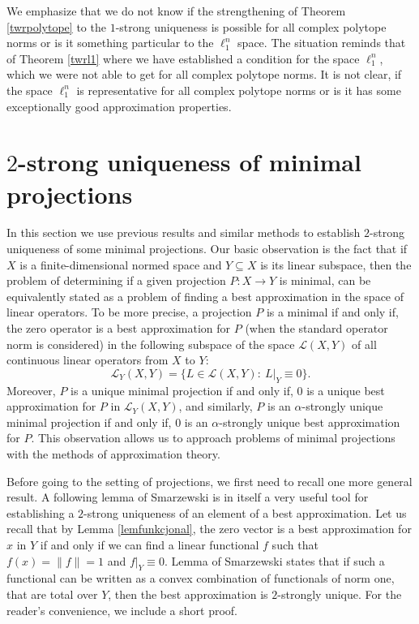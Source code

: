 \documentclass[12pt, reqno]{amsart}
\theoremstyle{definition}
\theoremstyle{remark}
\numberwithin{equation}{section}
\begin{document}
We emphasize that we do not know if the strengthening of Theorem \ref{twrpolytope} to the $1$-strong uniqueness is possible for all complex polytope norms or is it something particular to the $\ell_1^n$ space. The situation reminds that of Theorem \ref{twrl1} where we have established a condition for the space $\ell_1^n$, which we were not able to get for all complex polytope norms. It is not clear, if the space $\ell_1^n$ is representative for all complex polytope norms or is it has some exceptionally good approximation properties.

\section{$2$-strong uniqueness of minimal projections}
\label{sectionproj}

In this section we use previous results and similar methods to establish $2$-strong uniqueness of some minimal projections. Our basic observation is the fact that if $X$ is a finite-dimensional normed space and $Y \subseteq X$ is its linear subspace, then the problem of determining if a given projection $P: X \to Y$ is minimal, can be equivalently stated as a problem of finding a best approximation in the space of linear operators. To be more precise, a projection $P$ is a minimal if and only if, the zero operator is a best approximation for $P$ (when the standard operator norm is considered) in the following subspace of the space $\mathcal{L}(X, Y)$ of all continuous linear operators from $X$ to $Y$:
$$\mathcal{L}_Y(X, Y) = \{L \in \mathcal{L}(X, Y): \ L|_Y \equiv 0\}. $$
Moreover, $P$ is a unique minimal projection if and only if, $0$ is a unique best approximation for $P$ in $\mathcal{L}_Y(X, Y)$, and similarly, $P$ is an $\alpha$-strongly unique minimal projection if and only if, $0$ is an $\alpha$-strongly unique best approximation for $P$. This observation allows us to approach problems of minimal projections with the methods of approximation theory.

Before going to the setting of projections, we first need to recall one more general result. A following lemma of Smarzewski \cite{smarzewski} is in itself a very useful tool for establishing a $2$-strong uniqueness of an element of a best approximation. Let us recall that by Lemma \ref{lemfunkcjonal}, the zero vector is a best approximation for $x$ in $Y$ if and only if we can find a linear functional $f$ such that $f(x)=\|f\|=1$ and $f|_Y \equiv 0$. Lemma of Smarzewski states that if such a functional can be written as a convex combination of functionals of norm one, that are total over $Y$, then the best approximation is $2$-strongly unique. For the reader's convenience, we include a short proof.
\end{document}
